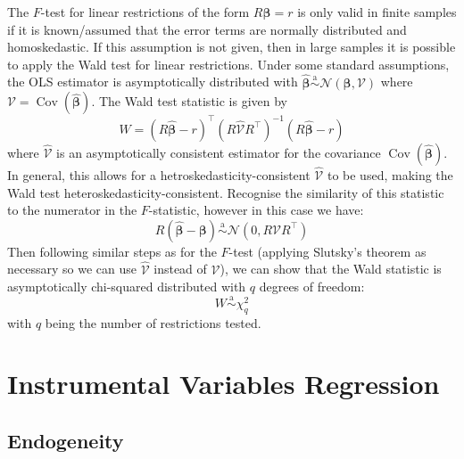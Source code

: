 \documentclass[11pt]{report} %
\begin{document}
The $F$-test for linear restrictions of the form $R\boldsymbol{\beta} = r$ is only valid in finite samples if it is known/assumed that the error terms are normally distributed and homoskedastic. If this assumption is not given, then in large samples it is possible to apply the Wald test for linear restrictions. Under some standard assumptions, the OLS estimator is asymptotically distributed with $\widehat{\boldsymbol{\beta}} \overset{\mathrm{a}}{\sim} \mathcal{N}\left(\boldsymbol{\beta}, \mathcal{V}\right)$ where $\mathcal{V} = \operatorname{Cov}\left(\widehat{\boldsymbol{\beta}}\right)$. The Wald test statistic is given by
\begin{equation}
W = \left(R\widehat{\boldsymbol{\beta}} - r\right)^{\top}\left(R\widehat{\mathcal{V}}R^{\top}\right)^{-1}\left(R\widehat{\boldsymbol{\beta}} - r\right)
\end{equation}
where $\widehat{\mathcal{V}}$ is an asymptotically consistent estimator for the covariance $\operatorname{Cov}\left(\widehat{\boldsymbol{\beta}}\right)$. In general, this allows for a hetroskedasticity-consistent $\widehat{\mathcal{V}}$ to be used, making the Wald test heteroskedasticity-consistent. Recognise the similarity of this statistic to the numerator in the $F$-statistic, however in this case we have:
\begin{equation}
R\left(\widehat{\boldsymbol{\beta}} - \boldsymbol{\beta}\right) \overset{\mathrm{a}}{\sim} \mathcal{N}\left(0, R\mathcal{V}R^{\top}\right)
\end{equation}
Then following similar steps as for the $F$-test (applying Slutsky's theorem as necessary so we can use $\widehat{\mathcal{V}}$ instead of $\mathcal{V}$), we can show that the Wald statistic is asymptotically chi-squared distributed with $q$ degrees of freedom:
\begin{equation}
W \overset{\mathrm{a}}{\sim} \chi_{q}^{2}
\end{equation}
with $q$ being the number of restrictions tested.

\section{Instrumental Variables Regression}

\subsection{Endogeneity}
\end{document}

